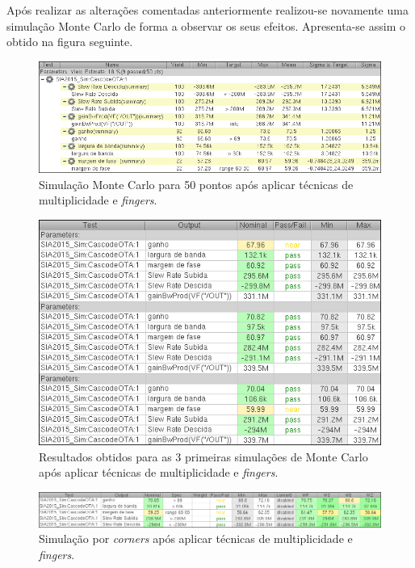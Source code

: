 \documentclass[11pt]{article}
\numberwithin{equation}{section}
\begin{document}
Após realizar as alterações comentadas anteriormente realizou-se novamente uma simulação Monte Carlo de forma a observar os seus efeitos. Apresenta-se assim o obtido na figura seguinte.

\begin{figure}[H]
	\centering
	\includegraphics[keepaspectratio=true, scale=0.65]{exps/MonteCarlo_50pt_Novo_Sin}
	\vspace{-0.5em}
	\caption{Simulação Monte Carlo para 50 pontos após aplicar técnicas de multiplicidade e \textit{fingers}.}
	\vspace{-0.8em}
\end{figure} 

\begin{figure}[H]
	\centering
	\includegraphics[keepaspectratio=true, scale=0.65]{exps/MonteCarlo_3pt_Novo_Sim}
	\vspace{-0.5em}
	\caption{Resultados obtidos para as 3 primeiras simulações de Monte Carlo após aplicar técnicas de multiplicidade e \textit{fingers}.}
	\vspace{-0.8em}
\end{figure} 

\begin{figure}[H]
	\centering
	\includegraphics[keepaspectratio=true, scale=0.65]{exps/Corners_Novo_Sim}
	\vspace{-0.5em}
	\caption{Simulação por \textit{corners} após aplicar técnicas de multiplicidade e \textit{fingers}.}
	\vspace{-0.8em}
\end{figure}
\end{document}
